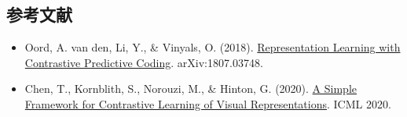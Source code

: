 \FloatBarrier
{}
\hypertarget{ux53c2ux8003ux6587ux732e-32}{%
\subsection{参考文献}\label{ux53c2ux8003ux6587ux732e-32}}

\vspace{0.25em}
\begin{itemize}
\tightlist
\item
  Oord, A. van den, Li, Y., \& Vinyals, O. (2018). \href{https://arxiv.org/abs/1807.03748}{Representation Learning with Contrastive Predictive Coding}. arXiv:1807.03748.
\item
  Chen, T., Kornblith, S., Norouzi, M., \& Hinton, G. (2020). \href{https://proceedings.mlr.press/v119/chen20j.html}{A Simple Framework for Contrastive Learning of Visual Representations}. ICML 2020.
\end{itemize}

\clearpage
